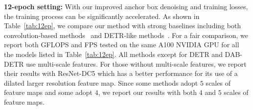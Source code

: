 \documentclass[runningheads]{llncs}
\begin{document}
\textbf{12-epoch setting:}
With our improved anchor box denoising and training losses, the training process can be significantly accelerated. As shown in Table~\ref{tab:12ep}, we compare our method with strong baselines including both convolution-based methods~\cite{ren2015faster,chen2019hybrid,dai2021dynamic} and DETR-like methods~\cite{carion2020end,zhu2020deformable,Dai_2021_ICCV,liu2022dab,li2022dn}. For a fair comparison, we report both GFLOPS and FPS tested on the same A100 NVIDIA GPU for all the models listed in Table~\ref{tab:12ep}. All methods except for DETR and DAB-DETR use multi-scale features. For those without multi-scale features, we report their results with ResNet-DC5 which has a better performance for its use of a dilated larger resolution feature map. Since some methods adopt $5$ scales of feature maps and some adopt $4$, we report our results with both $4$ and $5$ scales of feature maps. 
\end{document}
